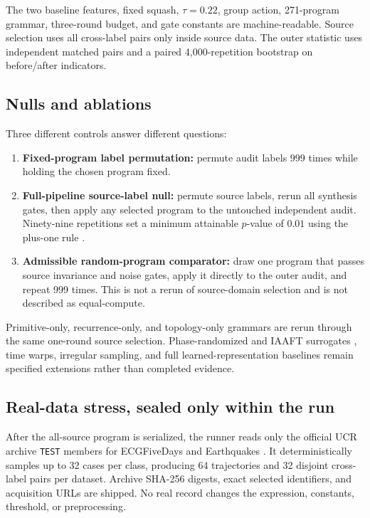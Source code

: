 \documentclass[10pt]{article}
\theoremstyle{definition}
\theoremstyle{remark}
\begin{document}
The two baseline features, fixed squash, $\tau=0.22$, group action, 271-program grammar, three-round budget, and gate constants are machine-readable. Source selection uses all cross-label pairs only inside source data. The outer statistic uses independent matched pairs and a paired 4,000-repetition bootstrap on before/after indicators.

\subsection{Nulls and ablations}

Three different controls answer different questions:
\begin{enumerate}
\item \textbf{Fixed-program label permutation:} permute audit labels 999 times while holding the chosen program fixed.
\item \textbf{Full-pipeline source-label null:} permute source labels, rerun all synthesis gates, then apply any selected program to the untouched independent audit. Ninety-nine repetitions set a minimum attainable $p$-value of $0.01$ using the plus-one rule \citep{PhipsonSmyth2010}.
\item \textbf{Admissible random-program comparator:} draw one program that passes source invariance and noise gates, apply it directly to the outer audit, and repeat 999 times. This is not a rerun of source-domain selection and is not described as equal-compute.
\end{enumerate}
Primitive-only, recurrence-only, and topology-only grammars are rerun through the same one-round source selection. Phase-randomized and IAAFT surrogates \citep{Theiler1992,SchreiberSchmitz1996}, time warps, irregular sampling, and full learned-representation baselines remain specified extensions rather than completed evidence.

\subsection{Real-data stress, sealed only within the run}

After the all-source program is serialized, the runner reads only the official UCR archive \texttt{TEST} members for ECGFiveDays and Earthquakes \citep{Dau2019}. It deterministically samples up to 32 cases per class, producing 64 trajectories and 32 disjoint cross-label pairs per dataset. Archive SHA-256 digests, exact selected identifiers, and acquisition URLs are shipped. No real record changes the expression, constants, threshold, or preprocessing.
\end{document}
